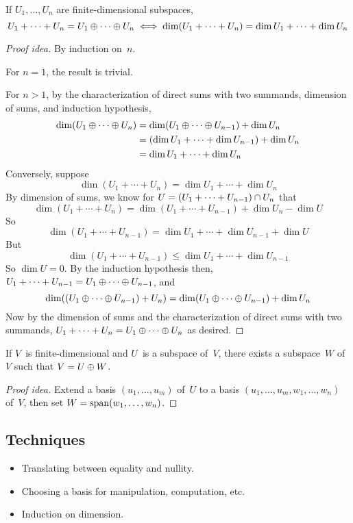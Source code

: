 \begin{cor}
If \(U_1,\ldots,U_n\) are finite-dimensional subspaces,
\[U_1+\cdots+U_n=U_1\oplus\cdots\oplus U_n\iff \dim(U_1+\cdots+U_n)=\dim U_1+\cdots+\dim U_n\]
\end{cor}
\begin{proof}[Proof idea]
By induction on~\(n\).

For \(n=1\), the result is trivial.

For \(n>1\), by the characterization of direct sums with two summands, dimension of sums, and induction hypothesis,
\begin{align*}
\dim(U_1\oplus\cdots\oplus U_n)&=\dim(U_1\oplus\cdots\oplus U_{n-1})+\dim U_n\\
	&=(\dim U_1+\cdots+\dim U_{n-1})+\dim U_n\\
	&=\dim U_1+\cdots+\dim U_n
\end{align*}
Conversely, suppose
\[\dim(U_1+\cdots+U_n)=\dim U_1+\cdots+\dim U_n\]
By dimension of sums, we know for \(U=(U_1+\cdots+U_{n-1})\cap U_n\) that
\[\dim(U_1+\cdots+U_n)=\dim(U_1+\cdots+U_{n-1})+\dim U_n-\dim U\]
So
\[\dim(U_1+\cdots+U_{n-1})=\dim U_1+\cdots+\dim U_{n-1}+\dim U\]
But
\[\dim(U_1+\cdots+U_{n-1})\le\dim U_1+\cdots+\dim U_{n-1}\]
So \(\dim U=0\). By the induction hypothesis then, \(U_1+\cdots+U_{n-1}=U_1\oplus\cdots\oplus U_{n-1}\), and
\[\dim((U_1\oplus\cdots\oplus U_{n-1})+U_n)=\dim(U_1\oplus\cdots\oplus U_{n-1})+\dim U_n\]
Now by the dimension of sums and the characterization of direct sums with two summands, \(U_1+\cdots+U_n=U_1\oplus\cdots\oplus U_n\) as desired.
\end{proof}

\begin{thm}
If \(V\)~is finite-dimensional and \(U\)~is a subspace of~\(V\), there exists a subspace~\(W\) of~\(V\) such that \(V=U\oplus W\).
\end{thm}
\begin{proof}[Proof idea]
Extend a basis \((u_1,\ldots,u_m)\) of~\(U\) to a basis \((u_1,\ldots,u_m,w_1,\ldots,w_n)\) of~\(V\), then set \(W=\operatorname{span}(w_1,\ldots,w_n)\).
\end{proof}

\subsection*{Techniques}
\begin{itemize}[itemsep=0pt]
\item Translating between equality and nullity.
\item Choosing a basis for manipulation, computation, etc.
\item Induction on dimension.
\end{itemize}
